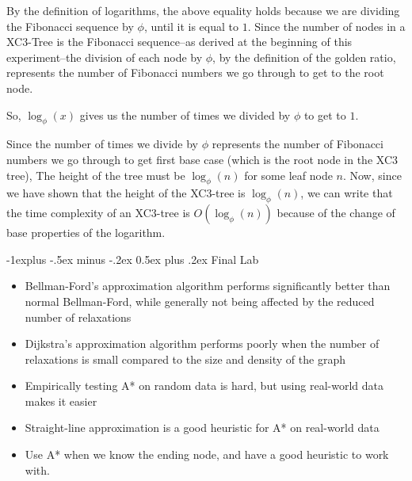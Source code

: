 \documentclass[letterpaper, 8pt]{extarticle}
\makeatletter
\renewcommand{\subsection}{\@startsection{subsection}{2}{0mm}%
                                {-1explus -.5ex minus -.2ex}%
                                {0.5ex plus .2ex}%
                                {\normalfont\small\bfseries}}
\makeatother
\begin{document}
\begin{multicols*}{5}
\begin{itemize}
By the definition of logarithms, the above equality holds because we are dividing the Fibonacci sequence by $\phi$,
until it is equal to $1$. Since the number of nodes in a XC3-Tree is the Fibonacci sequence--as derived at the beginning of this experiment--the
division of each node by $\phi$, by the definition of the golden ratio, represents the number of Fibonacci numbers we go through 
to get to the root node.

So, $\log_\phi (x)$ gives us the number of times we divided by $\phi$ to get to $1$.

Since the number of times we divide by $\phi$ represents
the number of Fibonacci numbers we go through to get first base case (which is the root node in the XC3 tree),
The height of the tree must be $\log_\phi (n)$ for some leaf node $n$. Now, since we have shown that the height of the XC3-tree is $\log_\phi (n)$, we can write
that the time complexity of an XC3-tree is $O(\log_\phi (n))$ because of the change of base properties of the logarithm.

\end{itemize}


\subsection{Final Lab}
\begin{itemize}
    \item Bellman-Ford's approximation algorithm performs significantly better than normal Bellman-Ford, while generally not being affected by the reduced number of relaxations
    \item Dijkstra's approximation algorithm performs poorly when the number of relaxations is small compared to the size and density of the graph
    \item Empirically testing A* on random data is hard, but using real-world data makes it easier
    \item Straight-line approximation is a good heuristic for A* on real-world data
    \item Use A* when we know the ending node, and have a good heuristic to work with.
\end{itemize}


\end{multicols*}
\end{document}
